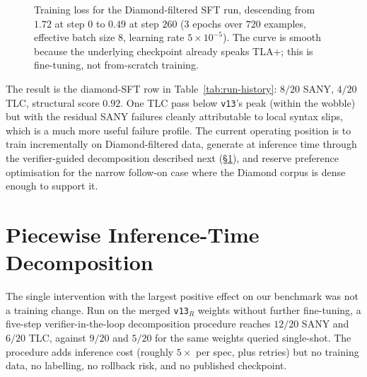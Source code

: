 \documentclass[11pt]{article}
\begin{document}
\begin{figure}[t]
\centering
{}
\caption{Training loss for the Diamond-filtered SFT run, descending
from $1.72$ at step $0$ to $0.49$ at step $260$ ($3$ epochs over $720$
examples, effective batch size $8$, learning rate $5\!\times\!10^{-5}$).
The curve is smooth because the underlying checkpoint already speaks
TLA+; this is fine-tuning, not from-scratch training.}
\label{fig:loss}
\end{figure}

The result is the diamond-SFT row in Table~\ref{tab:run-history}: $8/20$
SANY, $4/20$ TLC, structural score $0.92$. One TLC pass below
\texttt{v13}'s peak (within the wobble) but with the residual SANY
failures cleanly attributable to local syntax slips, which is a much
more useful failure profile. The current operating position is to train
incrementally on Diamond-filtered data, generate at inference time
through the verifier-guided decomposition described next
(\S\ref{sec:piecewise}), and reserve preference optimisation for the
narrow follow-on case where the Diamond corpus is dense enough to
support it.

\section{Piecewise Inference-Time Decomposition}
\label{sec:piecewise}

The single intervention with the largest positive effect on our
benchmark was not a training change. Run on the merged
\texttt{v13}$_R$ weights without further fine-tuning, a five-step
verifier-in-the-loop decomposition procedure reaches $12/20$ SANY and
$6/20$ TLC, against $9/20$ and $5/20$ for the same weights queried
single-shot. The procedure adds inference cost (roughly $5\!\times$ per
spec, plus retries) but no training data, no labelling, no rollback
risk, and no published checkpoint.
\end{document}
